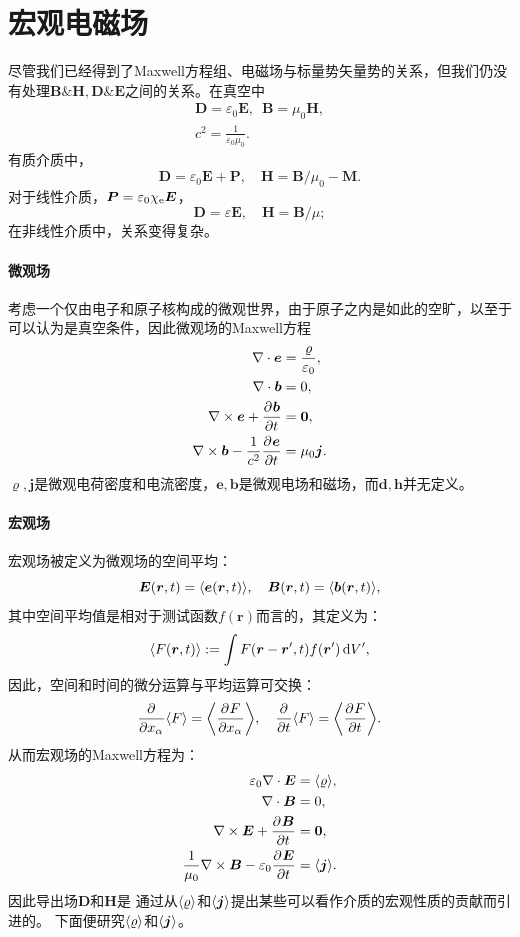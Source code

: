 \section{宏观电磁场}
尽管我们已经得到了Maxwell方程组、电磁场与标量势矢量势的关系，但我们仍没有处理$\bm B\&\bm H,\bm D\&\bm E$之间的关系。在真空中
\begin{gather*}
    \bm D = \varepsilon_0\bm E,\enspace\bm B = \mu_0\bm H,\\
    c^2 = \frac1{\varepsilon_0\mu_0}.
\end{gather*}
有质介质中，
\begin{equation}
    \label{eq:ed-macroscopic-constitutive-definitions}
    \bm D = \varepsilon_0\bm E + \bm P,\quad \bm H = \bm B/\mu_0 - \bm M.
\end{equation}
对于线性介质，$\bm P = \varepsilon_0\chi_\mathrm e\bm E$，
\begin{equation}
    \label{eq:ed-isotropic-constitutive-relations}
    \bm D = \varepsilon\bm E,\quad\bm H = \bm B/\mu;
\end{equation}
在非线性介质中，关系变得复杂。
\paragraph{微观场}
考虑一个仅由电子和原子核构成的微观世界，由于原子之内是如此的空旷，以至于可以认为是真空条件，因此微观场的Maxwell方程
\begin{align*}
    \nabla\cdot\bm e &= \frac\varrho{\varepsilon_0},\\
    \nabla\cdot\bm b &= 0,\\
    \nabla\times\bm e + \frac{\partial^{}\bm b}{\partial{t}^{}} &= \bm 0,\\
    \nabla\times\bm b - \frac1{c^2}\frac{\partial^{}\bm e}{\partial{t}^{}} &= \mu_0\bm j.
\end{align*}
$\varrho,\bm j$是微观电荷密度和电流密度，$\bm e,\bm b$是微观电场和磁场，而$\bm d,\bm h$并无定义。
\paragraph{宏观场}
宏观场被定义为微观场的空间平均：
\[
    \bm E(\bm r,t) = \langle\bm e(\bm r,t)\rangle,\quad \bm B(\bm r,t) = \langle\bm b(\bm r,t)\rangle,
\]
其中空间平均值是相对于测试函数$f(\bm r)$而言的，其定义为：
\begin{equation}
    \label{eq:ed-spatial-averaging}
    \langle F(\bm r,t)\rangle := \int F(\bm r - \bm r',t)f(\bm r')\mathop{}\!\mathrm{d} V',
\end{equation}
因此，空间和时间的微分运算与平均运算可交换：
\[
    \frac{\partial^{}}{\partial{x_\alpha}^{}}\langle F\rangle = \biggl\langle\frac{\partial^{}F}{\partial{x_\alpha}^{}}\biggr\rangle,\quad\frac{\partial^{}}{\partial{t}^{}}\langle F\rangle = \biggl\langle\frac{\partial^{}F}{\partial{t}^{}}\biggr\rangle.
\]
从而宏观场的Maxwell方程为： 
\begin{align}
    \label{eqn:average rho}
    \varepsilon_0\nabla\cdot\bm E &= \langle\varrho\rangle,\\
    \notag
    \nabla\cdot\bm B &= 0,\\
    \notag
    \nabla\times\bm E + \frac{\partial^{}\bm B}{\partial{t}^{}} &= \bm0,\\
    \label{eqn:average j}
    \frac1{\mu_0}\nabla\times\bm B - \varepsilon_0\frac{\partial^{}\bm E}{\partial{t}^{}} &= \langle\bm j\rangle.
\end{align}
因此导出场$\bm D$和$\bm H$是
通过从$\langle\varrho\rangle$和$\langle\bm j\rangle$提出某些可以看作介质的宏观性质的贡献而引进的。
下面便研究$\langle\varrho\rangle$和$\langle\bm j\rangle$。
